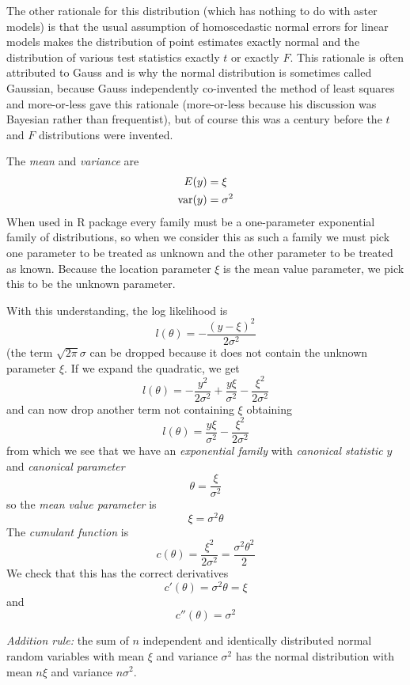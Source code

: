 The other rationale for this distribution (which has nothing to do with
aster models) is that the usual assumption of homoscedastic normal errors
for linear models makes the distribution of point estimates exactly normal
and the distribution of various test statistics exactly $t$ or exactly $F$.
This rationale is often attributed to Gauss and is why the normal distribution
is sometimes called Gaussian, because Gauss independently co-invented the
method of least squares and more-or-less gave this rationale (more-or-less
because his discussion was Bayesian rather than frequentist), but of course
this was a century before the $t$ and $F$ distributions were invented.

The \emph{mean} and \emph{variance} are
\begin{align*}
   E(y) & = \xi
   \\
   \operatorname{var}(y) & = \sigma^2
\end{align*}
When used in R package  every family must be a one-parameter
exponential family of distributions, so when we consider this as such a family
we must pick one parameter to be treated as unknown
and the other parameter to be treated as known.
Because the location parameter $\xi$ is the mean value parameter,
we pick this to be the unknown parameter.

With this understanding, the log likelihood is
$$
   l(\theta) = - \frac{(y - \xi)^2}{2 \sigma^2}
$$
(the term $\sqrt{2 \pi} \sigma$ can be dropped because it does not contain the
unknown parameter $\xi$.  If we expand the quadratic, we get
$$
   l(\theta)
   =
   - \frac{y^2}{2 \sigma^2}
   + \frac{y \xi}{\sigma^2}
   - \frac{\xi^2}{2 \sigma^2}
$$
and can now drop another term not containing $\xi$ obtaining
$$
   l(\theta)
   =
   \frac{y \xi}{\sigma^2} - \frac{\xi^2}{2 \sigma^2}
$$
from which we see that we have an \emph{exponential family} with
\emph{canonical statistic} $y$ and \emph{canonical parameter}
$$
   \theta = \frac{\xi}{\sigma^2}
$$
so the \emph{mean value parameter} is
$$
   \xi = \sigma^2 \theta
$$
The \emph{cumulant function} is
$$
   c(\theta) = \frac{\xi^2}{2 \sigma^2}
   = \frac{\sigma^2 \theta^2}{2}
$$
We check that this has the correct derivatives
$$
   c'(\theta) = \sigma^2 \theta = \xi
$$
and
$$
   c''(\theta) = \sigma^2
$$

\emph{Addition rule:} the sum of $n$ independent and identically distributed
normal random variables with mean $\xi$ and variance $\sigma^2$ has the normal
distribution with mean $n \xi$ and variance $n \sigma^2$.

